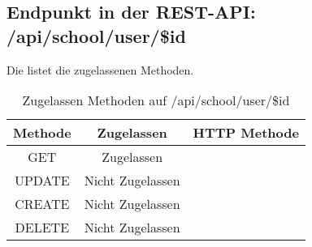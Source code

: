 \subsection{Endpunkt in der REST-API: /api/school/user/\$id}
Die  listet die zugelassenen Methoden. 

\begin{table}[!htbp]
	\begin{tabular}{|c|c|c|}
		\hline
			\textbf{Methode} & \textbf{Zugelassen} & \textbf{HTTP Methode} \\ \hline
			GET & Zugelassen &  \\ \hline
			UPDATE & Nicht Zugelassen & \\ \hline 
			CREATE & Nicht Zugelassen & \\ \hline 
			DELETE & Nicht Zugelassen & \\ \hline
	\end{tabular}

		\caption{Zugelassen Methoden auf /api/school/user/\$id}
		\label{tab:end:rest:api:school:user:id:meth}
\end{table}